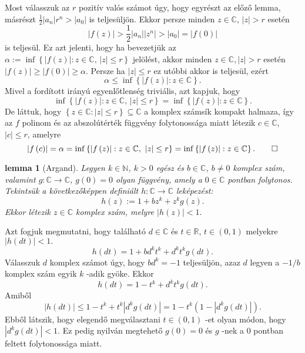 \documentclass[9pt, showtrims]{memoir}
\makeatletter
\renewenvironment{proof}[1][\proofname]
    {\par\pushQED{\qed}%
    \normalfont \topsep6\p@\@plus6\p@\relax
    \trivlist
    \item[\hskip\labelsep
        \itshape
    #1\@addpunct{:}]\ignorespaces}
    {\popQED\endtrivlist\@endpefalse}
\theoremstyle{plain}
\newtheorem{lemma}[proposition]{lemma}
\theoremstyle{remark}
\theoremstyle{definition}
\makeatother
\begin{document}
\begin{proof}
Most válasszuk az $r$ pozitív valós számot úgy, hogy egyrészt az előző lemma, másrészt $\frac{1}{2}\left|
a_{n}\right| r^{n}>\left| a_{0}\right| $ is teljesüljön.
Ekkor
persze minden $z\in \mathbb{C}$, $\left| z\right| >r$ esetén 
\[
\left| f\left( z\right) \right| >\frac{1}{2}\left| a_{n}\right| \left|
z^{n}\right| >\left| a_{0}\right| =\left| f\left( 0\right) \right| 
\]
is teljesül.
Ez azt jelenti, hogy ha bevezetjük az $\alpha :=\inf \left\{ \left|
f\left( z\right) \right| :z\in \mathbb{C}\text{, }\left| z\right| \leq
r\right\} $ jelölést, akkor minden $z\in \mathbb{C},\left| z\right| >r$
esetén $\left| f\left( z\right) \right| \geq \left| f\left( 0\right)
\right| \geq \alpha .$ Persze ha $\left| z\right| \leq r$ ez utóbbi
akkor is teljesül, ezért 
\[
\alpha \leq \inf \left\{ \left| f\left( z\right) \right| :z\in \mathbb{C}\right\} .
\]
Mivel a fordított irányú egyenlőtlenség triviális,
azt kapjuk, hogy 
\[
\inf \left\{ \left| f\left( z\right) \right| :z\in \mathbb{C}\text{, }\left|
z\right| \leq r\right\} =\inf \left\{ \left| f\left( z\right) \right| :z\in 
\mathbb{C}\right\} .
\]
De láttuk, hogy $\left\{ z\in \mathbb{C}:\left| z\right| \leq r\right\}
\subseteq \mathbb{C}$ a komplex számsík kompakt halmaza, így az $f$
polinom és az abszolútérték függvény folytonossága miatt létezik $c\in \mathbb{C}$, $\left| c\right| \leq r$, amelyre 
\[
\left| f\left( c\right) \right| =\alpha =\inf \left\{ \left| f\left(
z\right) \right| :z\in \mathbb{C}\text{, }\left| z\right| \leq r\right\} =\inf
\left\{ \left| f\left( z\right) \right| :z\in \mathbb{C}\right\}. \qedhere
\]
\end{proof}

\begin{lemma}[Argand]
\label{Th:Argand}Legyen $k\in \mathbb{N}$, $k>0$ egész és $b\in \mathbb{C}$, $b\neq 0$ komplex szám, valamint $g:\mathbb{C}\rightarrow \mathbb{C}$, $g\left( 0\right) =0$ olyan függvény, amely a $0\in \mathbb{C}$ pontban
folytonos.
Tekintsük a következőképpen definiált $h:\mathbb{C}\rightarrow \mathbb{C}$ leképezést: 
\[
h\left( z\right) :=1+bz^{k}+z^{k}g\left( z\right) .
\]
Ekkor létezik $z\in \mathbb{C}$ komplex szám, melyre $\left| h\left(
z\right) \right| <1.$
\end{lemma}

\begin{proof}
Azt fogjuk megmutatni, hogy található $d\in \mathbb{C}$ és $t\in 
\mathbb{R}$, $t\in \left( 0,1\right) $ melyekre $\left| h\left( dt\right)
\right| <1.$\[
h\left( dt\right) =1+bd^{k}t^{k}+d^{k}t^{k}g\left( dt\right) .
\]
Válasszuk $d$ komplex számot úgy, hogy $bd^{k}=-1$ teljesüljön, azaz $d$ legyen a $-1/b$ komplex szám egyik $k$ -adik gyöke.
Ekkor 
\[
h\left( dt\right) =1-t^{k}+d^{k}t^{k}g\left( dt\right) .
\]
Amiből 
\[
\left| h\left( dt\right) \right| \leq 1-t^{k}+t^{k}\left| d^{k}g\left(
dt\right) \right| =1-t^{k}\left( 1-\left| d^{k}g\left( dt\right) \right|
\right) .
\]
Ebből látszik, hogy elegendő megválasztani $t\in \left(
0,1\right) $ -et olyan módon, hogy $\left| d^{k}g\left( dt\right)
\right| <1.$ Ez pedig nyilván megtehető $g\left( 0\right) =0$ és 
$g$ -nek a $0$ pontban feltett folytonossága miatt.
\end{proof}
\end{document}
